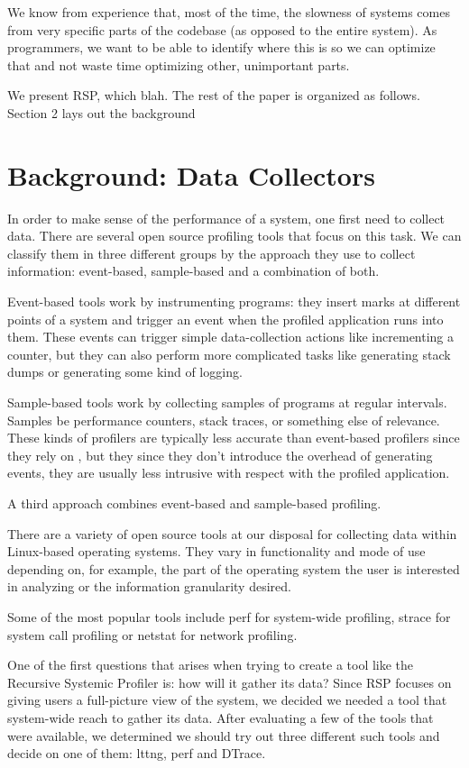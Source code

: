 \documentclass[10pt]{article}
\begin{document}
We know from experience that, most of the time, the slowness of systems comes from very specific parts of the codebase (as opposed to the entire system). As programmers, we want to be able to identify where this is so we can optimize that and not waste time optimizing other, unimportant parts.

We present RSP, which blah.
The rest of the paper is organized as follows. Section 2 lays out the background 

\section{Background: Data Collectors}
In order to make sense of the performance of a system, one first need to collect data. There are several open source profiling tools that focus on this task. We can classify them in three different groups by the approach they use to collect information: event-based, sample-based and a combination of both. 

Event-based tools work by instrumenting programs: they insert marks at different points of a system and trigger an event when the profiled application runs into them. These events can trigger simple data-collection actions like incrementing a counter, but they can also perform more complicated tasks like generating stack dumps or generating some kind of logging.

Sample-based tools work by collecting samples of programs at regular intervals.  Samples be performance counters, stack traces, or something else of relevance. These kinds of profilers are typically less accurate than event-based profilers since they rely on , but they since they don't introduce the overhead of generating events, they are usually less intrusive with respect with the profiled application.

A third approach combines event-based and sample-based profiling.

There are a variety of open source tools at our disposal for collecting data within Linux-based operating systems. They vary in functionality and mode of use depending on, for example, the part of the operating system the user is interested in analyzing or the information granularity desired.

Some of the most popular tools include perf for system-wide profiling, strace for system call profiling or netstat for network profiling.

One of the first questions that arises when trying to create a tool like the Recursive Systemic Profiler is: how will it gather its data? Since RSP focuses on giving users a full-picture view of the system, we decided we needed a tool that system-wide reach to gather its data. After evaluating a few of the tools that were available, we determined we should try out three different such tools and decide on one of them: lttng, perf and DTrace.
\end{document}
